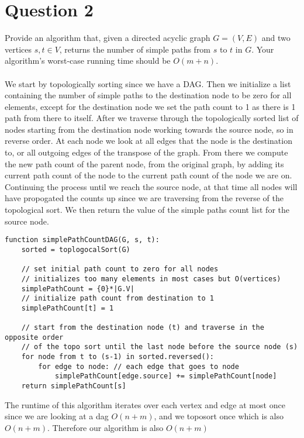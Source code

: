 \documentclass{article}
\begin{document}
\section*{Question 2}
Provide an algorithm that, given a directed acyclic graph $G=(V, E)$ and two vertices $s, t\in V$, returns the number of simple paths from $s$ to $t$ in $G$.
Your algorithm's worst-case running time should be $O(m +n)$.
\\ \\
We start by topologically sorting since we have a DAG.
Then we initialize a list containing the number of simple paths to the destination node to be zero for all elements, except for the destination node we set the path count to 1 as there is 1 path from there to itself.
After we traverse through the topologically sorted list of nodes starting from the destination node working towards the source node, so in reverse order.
At each node we look at all edges that the node is the destination to, or all outgoing edges of the transpose of the graph.
From there we compute the new path count of the parent node, from the original graph, by adding its current path count of the node to the current path count of the node we are on.
Continuing the process until we reach the source node, at that time all nodes will have propogated the counts up since we are traversing from the reverse of the topological sort.
We then return the value of the simple paths count list for the source node.

\begin{lstlisting}
function simplePathCountDAG(G, s, t):
    sorted = toplogocalSort(G)

    // set initial path count to zero for all nodes
    // initializes too many elements in most cases but O(vertices)
    simplePathCount = {0}*|G.V|
    // initialize path count from destination to 1
    simplePathCount[t] = 1

    // start from the destination node (t) and traverse in the opposite order
    // of the topo sort until the last node before the source node (s)
    for node from t to (s-1) in sorted.reversed():
        for edge to node: // each edge that goes to node
            simplePathCount[edge.source] += simplePathCount[node]
    return simplePathCount[s]

\end{lstlisting}

The runtime of this algorithm iterates over each vertex and edge at most once since we are looking at a dag $O(n+m)$, and we toposort once which is also $O(n+m)$.
Therefore our algorithm is also $O(n+m)$
\end{document}
